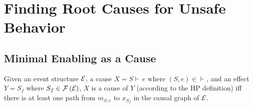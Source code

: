 \section{Finding Root Causes for Unsafe Behavior}

\subsection{Minimal Enabling as a Cause}

\begin{thm}\label{thm:hp-x-y}
Given an event structure $\mathcal{E}$, a cause $X = S \vdash\,e$
where $(S, e) \in \vdash$, and an effect $Y = S_f$
where $S_f \in \mathcal{F} \left( \mathcal{E} \right)$, $X$ is a cause of $Y$
(according to the HP definition) iff there is at least one path
from $m_{S,e}$ to $x_{S_f}$ in the causal graph of $\mathcal{E}$.
\end{thm}

